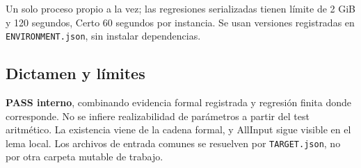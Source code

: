 \documentclass[11pt]{article}
\begin{document}
Un solo proceso propio a la vez; las regresiones serializadas tienen
límite de 2 GiB y 120 segundos, Certo 60 segundos por instancia. Se usan
versiones registradas en \nolinkurl{ENVIRONMENT.json}, sin instalar
dependencias.

\subsection{Dictamen y límites}\label{dictamen-y-luxedmites}

\textbf{PASS interno}, combinando evidencia formal registrada y
regresión finita donde corresponde. No se infiere realizabilidad de
parámetros a partir del test aritmético. La existencia viene de la
cadena formal, y AllInput sigue visible en el lema local. Los archivos
de entrada comunes se resuelven por \nolinkurl{TARGET.json}, no por otra
carpeta mutable de trabajo.
\end{document}
